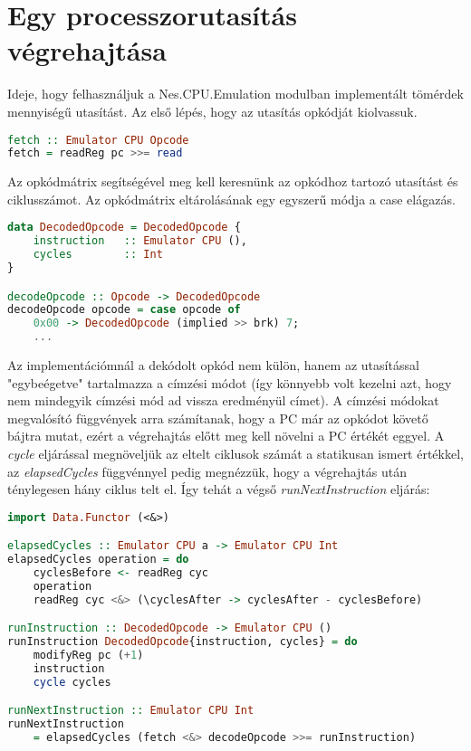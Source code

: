 \section{Egy processzorutasítás végrehajtása}
Ideje, hogy felhasználjuk a Nes.CPU.Emulation modulban implementált tömérdek mennyiségű utasítást. Az első lépés, hogy az utasítás opkódját kiolvassuk.
\vspace{0.3cm}
\begin{lstlisting}[language=Haskell, basicstyle=\scriptsize]
fetch :: Emulator CPU Opcode
fetch = readReg pc >>= read
\end{lstlisting}
\vspace{0.2cm}
Az opkódmátrix segítségével meg kell keresnünk az opkódhoz tartozó utasítást és ciklusszámot. Az opkódmátrix eltárolásának egy egyszerű módja a case elágazás.
\vspace{0.2cm}
\begin{lstlisting}[language=Haskell, basicstyle=\scriptsize]
data DecodedOpcode = DecodedOpcode {
	instruction   :: Emulator CPU (),
	cycles        :: Int
}

decodeOpcode :: Opcode -> DecodedOpcode
decodeOpcode opcode = case opcode of
	0x00 -> DecodedOpcode (implied >> brk) 7;
	...
\end{lstlisting}
\vspace{0.3cm}
Az implementációmnál a dekódolt opkód nem külön, hanem az utasítással "egybeégetve" tartalmazza a címzési módot (így könnyebb volt kezelni azt, hogy nem mindegyik címzési mód ad vissza eredményül címet). A címzési módokat megvalósító függvények arra számítanak, hogy a PC már az opkódot követő bájtra mutat, ezért a végrehajtás előtt meg kell növelni a PC értékét eggyel.
A \emph{cycle} eljárással megnöveljük az eltelt ciklusok számát a statikusan ismert értékkel, az \emph{elapsedCycles} függvénnyel pedig megnézzük, hogy a végrehajtás után ténylegesen hány ciklus telt el.
Így tehát a végső \emph{runNextInstruction} eljárás:
\vspace{0.3cm}
\begin{lstlisting}[language=Haskell, basicstyle=\scriptsize]
import Data.Functor (<&>)

elapsedCycles :: Emulator CPU a -> Emulator CPU Int
elapsedCycles operation = do
	cyclesBefore <- readReg cyc
	operation
	readReg cyc <&> (\cyclesAfter -> cyclesAfter - cyclesBefore)

runInstruction :: DecodedOpcode -> Emulator CPU ()
runInstruction DecodedOpcode{instruction, cycles} = do
	modifyReg pc (+1)
	instruction
	cycle cycles

runNextInstruction :: Emulator CPU Int
runNextInstruction 
 	= elapsedCycles (fetch <&> decodeOpcode >>= runInstruction)
\end{lstlisting}

